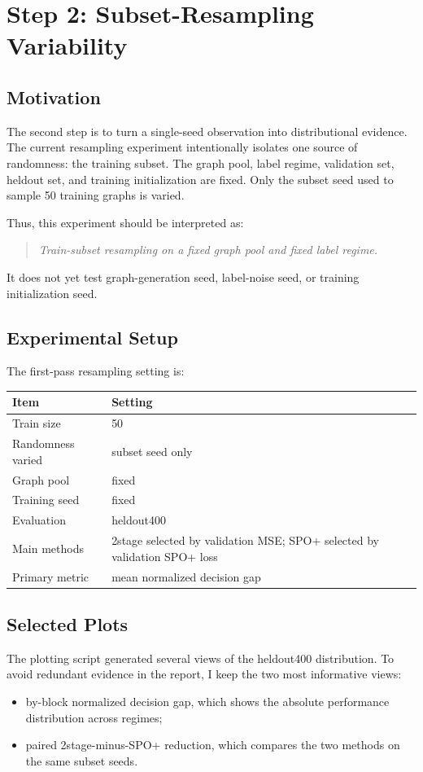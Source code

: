 \documentclass[11pt]{article}
\begin{document}
\section{Step 2: Subset-Resampling Variability}
\label{sec:resampling-variability}

\subsection{Motivation}
The second step is to turn a single-seed observation into distributional
evidence. The current resampling experiment intentionally isolates one source
of randomness: the training subset. The graph pool, label regime, validation
set, heldout set, and training initialization are fixed. Only the subset seed
used to sample 50 training graphs is varied.

Thus, this experiment should be interpreted as:

\begin{quote}
\emph{Train-subset resampling on a fixed graph pool and fixed label regime.}
\end{quote}

It does not yet test graph-generation seed, label-noise seed, or training
initialization seed.

\subsection{Experimental Setup}
The first-pass resampling setting is:

\begin{center}
\begin{tabular}{ll}
\toprule
Item & Setting \\
\midrule
Train size & 50 \\
Randomness varied & subset seed only \\
Graph pool & fixed \\
Training seed & fixed \\
Evaluation & heldout400 \\
Main methods & 2stage selected by validation MSE; SPO+ selected by validation SPO+ loss \\
Primary metric & mean normalized decision gap \\
\bottomrule
\end{tabular}
\end{center}

\subsection{Selected Plots}
The plotting script generated several views of the heldout400 distribution. To
avoid redundant evidence in the report, I keep the two most informative views:
\begin{itemize}
    \item by-block normalized decision gap, which shows the absolute
    performance distribution across regimes;
    \item paired 2stage-minus-SPO+ reduction, which compares the two methods on
    the same subset seeds.
\end{itemize}
\end{document}
